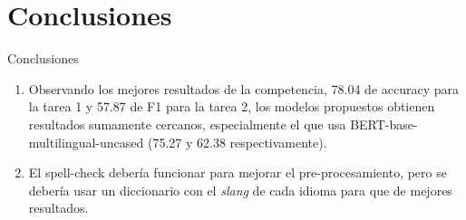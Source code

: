 \documentclass[10pt]{beamer}
\begin{document}
\section{Conclusiones}
\begin{frame}{Conclusiones}
\justify	
\small

\begin{enumerate}
\item Observando los mejores resultados de la competencia, 78.04 de accuracy para la tarea 1 y 57.87 de F1 para la tarea 2, los modelos propuestos obtienen resultados sumamente cercanos, especialmente el que usa BERT-base-multilingual-uncased (75.27 y 62.38 respectivamente).


\item El spell-check debería funcionar para mejorar el pre-procesamiento, pero se debería usar un diccionario con el \emph{slang} de cada idioma para que de mejores resultados.
\end{enumerate}

\end{frame}

%
%
%
%
\end{document}
